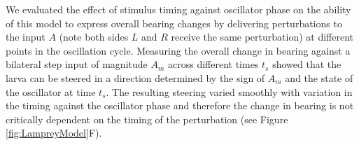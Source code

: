 \documentclass[11pt,a4paper]{article}
\newcommand{\todoBW}[1]{\todo[author=BW,color=orange, size=\tiny,inline]{#1}}
\begin{document}

We evaluated the effect of stimulus timing against oscillator phase  on the ability of this model to express overall bearing changes by delivering perturbations to the input $A$ (note both sides $L$ and $R$ receive the same perturbation) at different points in the oscillation cycle.
 Measuring the overall change in bearing against a bilateral step input of magnitude $A_m$ across different times $t_s$ showed that the larva can be steered in a direction determined by the sign of $A_m$ and the state of the oscillator at time $t_s$.
  The resulting steering varied smoothly with variation in the timing against the oscillator phase and therefore the change in bearing is not critically dependent on the timing of the perturbation (see Figure \ref{fig:LampreyModel}F). 

\end{document}
